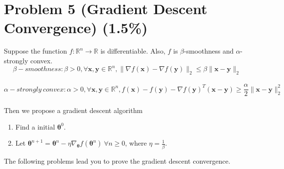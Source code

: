 \documentclass{article}
\begin{document}
\section*{Problem 5 (Gradient Descent Convergence) (1.5\%)}
 Suppose the function $f:\mathbb{R}^n \rightarrow \mathbb{R}$ is differentiable. Also, $f$ is $\beta$-smoothness and $\alpha$-strongly convex. \\
 $$\beta-smoothness: \beta > 0, \forall \boldsymbol{x}, \boldsymbol{y} \in \mathbb{R}^n, 
 \lVert \nabla f(\boldsymbol{x})- \nabla f(\boldsymbol{y}) \rVert_2  \leq  \beta \lVert \boldsymbol{x} - \boldsymbol{y} \rVert_2$$ \\
 $$\alpha-strongly \ convex: \alpha > 0, \forall \boldsymbol{x}, \boldsymbol{y} \in \mathbb{R}^n, 
 f(\boldsymbol{x})-f(\boldsymbol{y})-\nabla f(\boldsymbol{y})^T (\boldsymbol{x} - \boldsymbol{y}) \geq \frac{\alpha}{2} \lVert \boldsymbol{x} - \boldsymbol{y} \rVert_2^2$$ \\
 Then we propose a gradient descent algorithm
 \begin{enumerate}
    \item Find a initial $\boldsymbol{\theta}^0.$
     \item Let $\boldsymbol{\theta}^{n+1} = \boldsymbol{\theta}^{n} - \eta \nabla_{\boldsymbol{\theta}}f(\boldsymbol{\theta}^n) \ \forall n \geq 0$, where $\eta=\frac{1}{\beta}.$
 \end{enumerate}
The following problems lead you to prove the gradient descent convergence.
\end{document}
